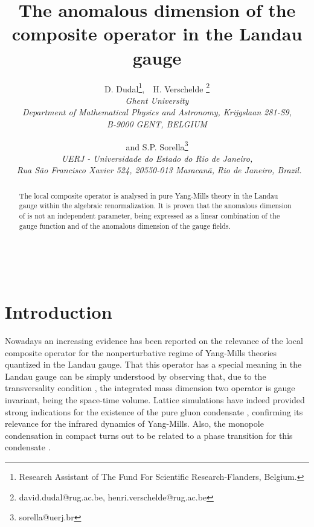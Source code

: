 \documentclass[a4paper,12pt]{article}
\begin{document}
\title{\textbf{The anomalous dimension of the composite operator }\coordHE{} \textbf{%
in the Landau gauge}}
\author{D. Dudal\thanks{%
Research Assistant of The Fund For Scientific Research-Flanders, Belgium.},\
\ H. Verschelde \thanks{%
david.dudal@rug.ac.be, henri.verschelde@rug.ac.be} \\
{\small {\textit{Ghent University }}}\\
{\small {\textit{Department of Mathematical Physics and Astronomy,
Krijgslaan 281-S9, }}}\\
{\small {\textit{B-9000 GENT, BELGIUM}}} \and and S.P. Sorella\thanks{%
sorella@uerj.br} \\
{\small {\textit{UERJ - Universidade do Estado do Rio de Janeiro,}}} \\
{\small {\textit{\ Rua S\~{a}o Francisco Xavier 524, 20550-013 Maracan\~{a}, 
}}} {\small {\textit{Rio de Janeiro, Brazil.}}}}
\maketitle

\begin{abstract}
The local composite operator \coordHE{}is analysed in pure Yang-Mills theory
in the Landau gauge within the algebraic renormalization. It is proven that
the anomalous dimension of \myHighlight{$A^{2}$}\coordHE{} is not an independent parameter, being
expressed as a linear combination of the gauge \myHighlight{$\beta $}\coordHE{} function and of the
anomalous dimension of the gauge fields.
\end{abstract}

\vfill\newpage \ \makeatother

\renewcommand{\theequation}{\thesection.\arabic{equation}}

\section{Introduction}

Nowadays an increasing evidence has been reported on the relevance of the
local composite operator \myHighlight{$A_{\mu }^{a}A^{a\mu \;}$}\coordHE{}for the nonperturbative
regime of Yang-Mills theories quantized in the Landau gauge. That this
operator has a special meaning in the Landau gauge can be simply understood
by observing that, due to the transversality condition \myHighlight{$\partial _{\mu
}A^{a\mu }=0$}\coordHE{}, the integrated mass dimension two operator \myHighlight{$\left( VT\right)
^{-1}\int d^{4}xA_{\mu }^{a}A^{\mu a}$}\coordHE{} is gauge invariant, \myHighlight{$VT$}\coordHE{} being the
space-time volume. Lattice simulations \cite{b} have indeed provided strong
indications for the existence of the pure gluon condensate \myHighlight{$\left\langle
A_{\mu }^{a}A^{a\mu \;}\right\rangle $}\coordHE{}, confirming its relevance for the
infrared dynamics of Yang-Mills. Also, the monopole condensation in compact \myHighlight{$%
QED$}\coordHE{} turns out to be related to a phase transition for this condensate \cite
{g}.
\end{document}
